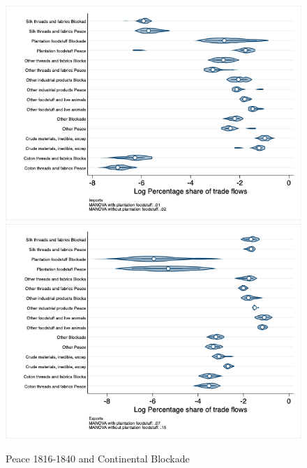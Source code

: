 \documentclass[12pt,a4paper,notitlepage,english]{article}
\begin{document}
\begin{figure}
\centering
\caption{Peace 1816-1840 and Continental Blockade}
\label{peace1816_1840_block_nat_distr_aggr}
\includegraphics[scale=.4]{peace1816_1840_block_nat_distr_Iaggr}
\includegraphics[scale=.4]{peace1816_1840_block_nat_distr_Xaggr}
\end{figure}
\end{document}
